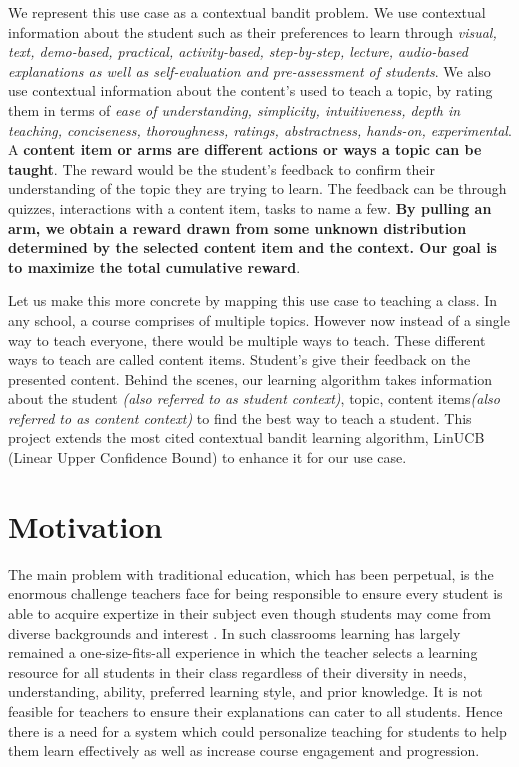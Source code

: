 We represent this use case as a contextual bandit problem. We use contextual information about the student such as their preferences to learn through \textit{visual, text, demo-based, practical, activity-based, step-by-step, lecture, audio-based explanations as well as self-evaluation and pre-assessment of students}. We also use contextual information about the content's used to teach a topic, by rating them in terms of \textit{ease of understanding, simplicity, intuitiveness, depth in teaching, conciseness, thoroughness, ratings, abstractness, hands-on, experimental}. A \textbf{content item or arms are different actions or ways a topic can be taught}. The reward would be the student's feedback to confirm their understanding of the topic they are trying to learn. The feedback can be through quizzes, interactions with a content item, tasks to name a few. \textbf{By pulling an arm, we obtain a reward drawn from some unknown distribution determined by the selected content item and the context. Our goal is to maximize the total cumulative reward}.  \par 

Let us make this more concrete by mapping this use case to teaching a class. In any school, a course comprises of multiple topics. However now instead of a single way to teach everyone, there would be multiple ways to teach. These different ways to teach are called content items. Student's give their feedback on the presented content. Behind the scenes, our learning algorithm takes information about the student \textit{(also referred to as student context)}, topic, content items\textit{(also referred to as content context)} to find the best way to teach a student. This project extends the most cited contextual bandit learning algorithm, LinUCB (Linear Upper Confidence Bound) \cite{li2010contextual} to enhance it for our use case. \par

\section{Motivation \label{chap1:motivation}}

The main problem with traditional education, which has been perpetual, is the enormous challenge teachers face for being responsible to ensure every student is able to acquire expertize in their subject even though students may come from diverse backgrounds and interest \cite{educauseReview}. In such classrooms learning has largely remained a one-size-fits-all experience in which the teacher selects a learning resource for all students in their class regardless of their diversity in needs, understanding, ability, preferred learning style, and prior knowledge. It is not feasible for teachers to ensure their explanations can cater to all students. Hence there is a need for a system which could personalize teaching for students to help them learn effectively as well as increase course engagement and progression.\par

